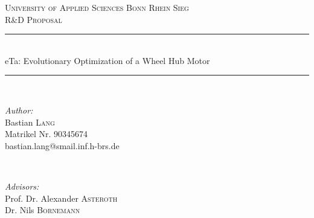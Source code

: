 \documentclass[12pt]{article}
\begin{document}
\begin{titlepage}

\newcommand{\HRule}{\rule{\linewidth}{0.5mm}} %

\center %
 

\textsc{\Large University of Applied Sciences Bonn Rhein Sieg}\\[0.4cm] %
\textsc{\Large R\&D Proposal}\\[0.5cm] %


\HRule \\[0.4cm]
{ \large eTa: Evolutionary Optimization of a Wheel Hub Motor}\\[0.01cm] %
\HRule \\[1.5cm]
 

\begin{minipage}{0.4\textwidth}
\begin{flushleft} \large
\emph{Author:}\\ [0.0cm]
Bastian \textsc{Lang}\\ [0.0cm] %
\small{ Matrikel Nr. 90345674} \\ [0.0cm]
\footnotesize{ bastian.lang@smail.inf.h-brs.de}
\end{flushleft}
\end{minipage}
~
\begin{minipage}{0.5\textwidth}
\begin{flushright} \large
\emph{Advisors:} \\ [0.0cm]
Prof. Dr. Alexander \textsc{Asteroth} \\ %
Dr. Nils \textsc{Bornemann}
\end{flushright}
\end{minipage}\\[4cm]


\end{titlepage}
\end{document}
